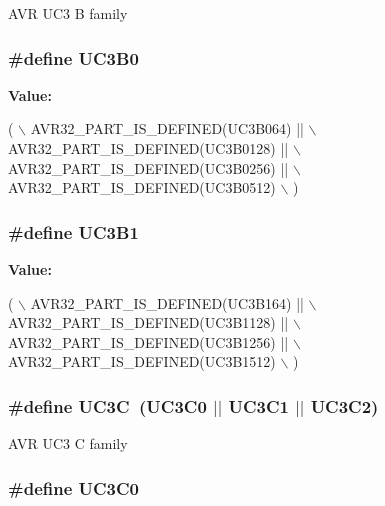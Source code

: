 A\-V\-R U\-C3 B family \hypertarget{group__uc3__part__macros__group_ga701194230718f73a89efc39742e061af}{
\subsubsection[{U\-C3\-B0}]{\setlength{\rightskip}{0pt plus 5cm}\#define U\-C3\-B0}}\label{group__uc3__part__macros__group_ga701194230718f73a89efc39742e061af}
{\bfseries Value\-:}
\begin{DoxyCode}
(   \(\backslash\)
        AVR32\_PART\_IS\_DEFINED(UC3B064)  || \(\backslash\)
        AVR32\_PART\_IS\_DEFINED(UC3B0128) || \(\backslash\)
        AVR32\_PART\_IS\_DEFINED(UC3B0256) || \(\backslash\)
        AVR32\_PART\_IS\_DEFINED(UC3B0512) \(\backslash\)
        )
\end{DoxyCode}
\hypertarget{group__uc3__part__macros__group_ga96602eec1c923afe92a64d807a242cd7}{
\subsubsection[{U\-C3\-B1}]{\setlength{\rightskip}{0pt plus 5cm}\#define U\-C3\-B1}}\label{group__uc3__part__macros__group_ga96602eec1c923afe92a64d807a242cd7}
{\bfseries Value\-:}
\begin{DoxyCode}
(   \(\backslash\)
        AVR32\_PART\_IS\_DEFINED(UC3B164)  || \(\backslash\)
        AVR32\_PART\_IS\_DEFINED(UC3B1128) || \(\backslash\)
        AVR32\_PART\_IS\_DEFINED(UC3B1256) || \(\backslash\)
        AVR32\_PART\_IS\_DEFINED(UC3B1512) \(\backslash\)
        )
\end{DoxyCode}
\hypertarget{group__uc3__part__macros__group_gac7a13b9ceb67804d94b6a8967512ee71}{
\subsubsection[{U\-C3\-C}]{\setlength{\rightskip}{0pt plus 5cm}\#define U\-C3\-C~({\bf U\-C3\-C0} $|$$|$ {\bf U\-C3\-C1} $|$$|$ {\bf U\-C3\-C2})}}\label{group__uc3__part__macros__group_gac7a13b9ceb67804d94b6a8967512ee71}
A\-V\-R U\-C3 C family \hypertarget{group__uc3__part__macros__group_ga4519bacce7868e73227b94af6e2a1b7f}{
\subsubsection[{U\-C3\-C0}]{\setlength{\rightskip}{0pt plus 5cm}\#define U\-C3\-C0}}\label{group__uc3__part__macros__group_ga4519bacce7868e73227b94af6e2a1b7f}
